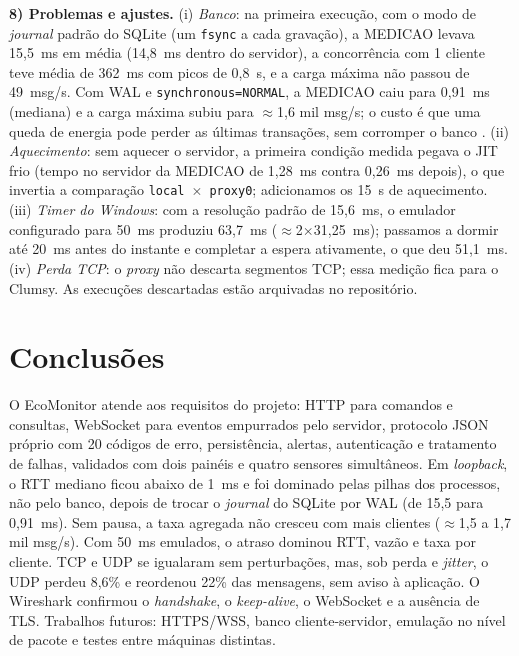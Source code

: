 \documentclass[conference]{IEEEtran}
\begin{document}
\textbf{8) Problemas e ajustes.} (i) \emph{Banco}: na primeira execução, com o modo de \emph{journal} padrão do SQLite (um \texttt{fsync} a cada gravação), a MEDICAO levava 15,5~ms em média (14,8~ms dentro do servidor), a concorrência com 1 cliente teve média de 362~ms com picos de 0,8~s, e a carga máxima não passou de 49~msg/s. Com WAL e \texttt{synchronous=NORMAL}, a MEDICAO caiu para 0,91~ms (mediana) e a carga máxima subiu para $\approx$1,6 mil msg/s; o custo é que uma queda de energia pode perder as últimas transações, sem corromper o banco \cite{sqlite}. (ii) \emph{Aquecimento}: sem aquecer o servidor, a primeira condição medida pegava o JIT frio (tempo no servidor da MEDICAO de 1,28~ms contra 0,26~ms depois), o que invertia a comparação \texttt{local}~$\times$~\texttt{proxy0}; adicionamos os 15~s de aquecimento. (iii) \emph{Timer do Windows}: com a resolução padrão de 15,6~ms, o emulador configurado para 50~ms produziu 63,7~ms ($\approx$2$\times$31,25~ms); passamos a dormir até 20~ms antes do instante e completar a espera ativamente, o que deu 51,1~ms. (iv) \emph{Perda TCP}: o \emph{proxy} não descarta segmentos TCP; essa medição fica para o Clumsy. As execuções descartadas estão arquivadas no repositório.

\section{Conclusões}
O EcoMonitor atende aos requisitos do projeto: HTTP para comandos e consultas, WebSocket para eventos empurrados pelo servidor, protocolo JSON próprio com 20 códigos de erro, persistência, alertas, autenticação e tratamento de falhas, validados com dois painéis e quatro sensores simultâneos. Em \emph{loopback}, o RTT mediano ficou abaixo de 1~ms e foi dominado pelas pilhas dos processos, não pelo banco, depois de trocar o \emph{journal} do SQLite por WAL (de 15,5 para 0,91~ms). Sem pausa, a taxa agregada não cresceu com mais clientes ($\approx$1,5 a 1,7 mil msg/s). Com 50~ms emulados, o atraso dominou RTT, vazão e taxa por cliente. TCP e UDP se igualaram sem perturbações, mas, sob perda e \emph{jitter}, o UDP perdeu 8,6\% e reordenou 22\% das mensagens, sem aviso à aplicação. O Wireshark confirmou o \emph{handshake}, o \emph{keep-alive}, o WebSocket e a ausência de TLS. Trabalhos futuros: HTTPS/WSS, banco cliente-servidor, emulação no nível de pacote e testes entre máquinas distintas.
\end{document}
